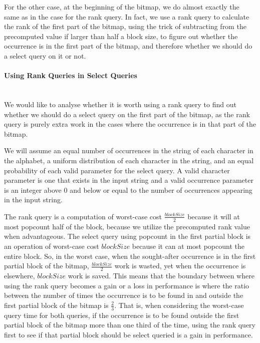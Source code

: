 For the other case, at the beginning of the bitmap, we do almost exactly the same as in the case for the rank query.
In fact, we use a rank query to calculate the rank of the first part of the bitmap, using the trick of subtracting from the precomputed value if larger than half a block size, to figure out whether the occurrence is in the first part of the bitmap, and therefore whether we should do a select query on it or not.

\paragraph{Using Rank Queries in Select Queries}~\\
We would like to analyse whether it is worth using a rank query to find out whether we should do a select query on the first part of the bitmap, as the rank query is purely extra work in the cases where the occurrence is in that part of the bitmap.

We will assume an equal number of occurrences in the string of each character in the alphabet, a uniform distribution of each character in the string, and an equal probability of each valid parameter for the select query.
A valid character parameter is one that exists in the input string and a valid occurrence parameter is an integer above 0 and below or equal to the number of occurrences appearing in the input string.

The rank query is a computation of worst-case cost $\frac{blockSize}{2}$ because it will at most popcount half of the block, because we utilize the precomputed rank value when advantageous.
The select query using popcount in the first partial block is an operation of worst-case cost $blockSize$ because it can at most popcount the entire block.
So, in the worst case, when the sought-after occurrence is in the first partial block of the bitmap, $\frac{blockSize}{2}$ work is wasted, yet when the occurrence is elsewhere, $blockSize$ work is saved.
This means that the boundary between where using the rank query becomes a gain or a loss in performance is where the ratio between the number of times the occurrence is to be found in and outside the first partial block of the bitmap is $\frac{2}{3}$.
That is, when considering the worst-case query time for both queries, if the occurrence is to be found outside the first partial block of the bitmap more than one third of the time, using the rank query first to see if that partial block should be select queried is a gain in performance.

